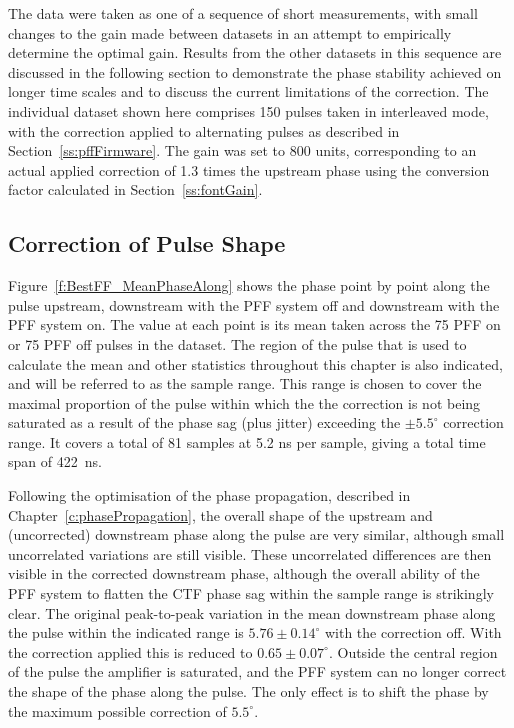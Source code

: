 The data were taken as one of a sequence of short measurements, with small changes to the gain made between datasets in an attempt to empirically determine the optimal gain. Results from the other datasets in this sequence are discussed in the following section to demonstrate the phase stability achieved on longer time scales and to discuss the current limitations of the correction. The individual dataset shown here comprises 150 pulses taken in interleaved mode, with the correction applied to alternating pulses as described in Section~\ref{ss:pffFirmware}. The gain was set to 800 units, corresponding to an actual applied correction of 1.3 times the upstream phase using the conversion factor calculated in Section~\ref{ss:fontGain}.

\subsection{Correction of Pulse Shape}
\label{ss:bestPulseShape}

Figure~\ref{f:BestFF_MeanPhaseAlong} shows the phase point by point along the pulse upstream, downstream with the PFF system off and downstream with the PFF system on. The value at each point is its mean taken across the 75 PFF on or 75 PFF off pulses in the dataset. The region of the pulse that is used to calculate the mean and other statistics throughout this chapter is also indicated, and will be referred to as the sample range. This range is chosen to cover the maximal proportion of the pulse within which the the correction is not being saturated as a result of the phase sag (plus jitter) exceeding the \(\pm5.5^\circ\) correction range. It covers a total of 81 samples at 5.2 ns per sample, giving a total time span of 422~ns. %

Following the optimisation of the phase propagation, described in Chapter~\ref{c:phasePropagation}, the overall shape of the upstream and (uncorrected) downstream phase along the pulse are very similar, although small uncorrelated variations are still visible. These uncorrelated differences are then visible in the corrected downstream phase, although the overall ability of the PFF system to flatten the CTF phase sag within the sample range is strikingly clear. The original peak-to-peak variation in the mean downstream phase along the pulse within the indicated range is \(5.76\pm0.14^\circ\) with the correction off. With the correction applied this is reduced to \(0.65\pm0.07^\circ\). Outside the central region of the pulse the amplifier is saturated, and the PFF system can no longer correct the shape of the phase along the pulse. The only effect is to shift the phase by the maximum possible correction of \(5.5^\circ\).

